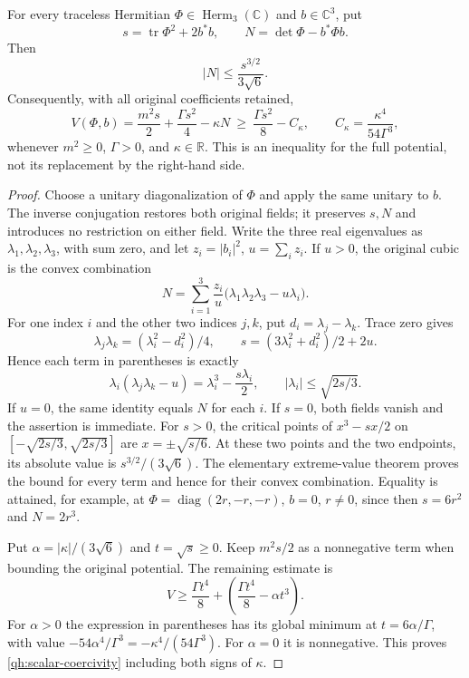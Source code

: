 \begin{lemma}
\label{qh:scalar-bound}
For every traceless Hermitian $\Phi\in\operatorname{Herm}_3(\mathbb C)$
and $b\in\mathbb C^3$, put
\[
 s=\operatorname{tr}\Phi^2+2b^*b,\qquad
 N=\det\Phi-b^*\Phi b.
\]
Then
\begin{equation}\label{qh:cubic-bound}
 |N|\leq\frac{s^{3/2}}{3\sqrt6}.
\end{equation}
Consequently, with all original coefficients retained,
\begin{equation}\label{qh:scalar-coercivity}
 V(\Phi,b)=\frac{m^2s}{2}+\frac{\Gamma s^2}{4}-\kappa N
 \ \geq\ \frac{\Gamma s^2}{8}-C_\kappa,
 \qquad C_\kappa=\frac{\kappa^4}{54\Gamma^3},
\end{equation}
whenever $m^2\geq0$, $\Gamma>0$, and $\kappa\in\mathbb R$.
This is an inequality for the full potential, not its replacement by
the right-hand side.
\end{lemma}
\begin{proof}
Choose a unitary diagonalization of $\Phi$ and apply the same unitary
to $b$. The inverse conjugation restores both original fields; it
preserves $s,N$ and introduces no restriction on either field.
Write the three real eigenvalues as $\lambda_1,\lambda_2,\lambda_3$,
with sum zero, and let $z_i=|b_i|^2$, $u=\sum_i z_i$.
If $u>0$, the original cubic is the convex combination
\[
 N=\sum_{i=1}^3\frac{z_i}{u}
       \bigl(\lambda_1\lambda_2\lambda_3-u\lambda_i\bigr).
\]
For one index $i$ and the other two indices $j,k$, put
$d_i=\lambda_j-\lambda_k$. Trace zero gives
\[
 \lambda_j\lambda_k=(\lambda_i^2-d_i^2)/4,\qquad
 s=(3\lambda_i^2+d_i^2)/2+2u.
\]
Hence each term in parentheses is exactly
\[
 \lambda_i(\lambda_j\lambda_k-u)
       =\lambda_i^3-\frac{s\lambda_i}{2},\qquad
 |\lambda_i|\leq\sqrt{2s/3}.
\]
If $u=0$, the same identity equals $N$ for each $i$.
If $s=0$, both fields vanish and the assertion is immediate.
For $s>0$, the critical points of $x^3-sx/2$ on
$[-\sqrt{2s/3},\sqrt{2s/3}]$ are $x=\pm\sqrt{s/6}$.
At these two points and the two endpoints, its absolute value is
$s^{3/2}/(3\sqrt6)$. The elementary extreme-value theorem proves
the bound for every term and hence for their convex combination.
Equality is attained, for example, at
$\Phi=\operatorname{diag}(2r,-r,-r)$, $b=0$, $r\ne0$,
since then $s=6r^2$ and $N=2r^3$.

Put $\alpha=|\kappa|/(3\sqrt6)$ and $t=\sqrt{s}\geq0$.
Keep $m^2s/2$ as a nonnegative term when bounding the original
potential. The remaining estimate is
\[
 V\geq\frac{\Gamma t^4}{8}
       +\left(\frac{\Gamma t^4}{8}-\alpha t^3\right).
\]
For $\alpha>0$ the expression in parentheses has its global minimum
at $t=6\alpha/\Gamma$, with value
$-54\alpha^4/\Gamma^3=-\kappa^4/(54\Gamma^3)$.
For $\alpha=0$ it is nonnegative. This proves
\eqref{qh:scalar-coercivity} including both signs of $\kappa$.
\end{proof}


